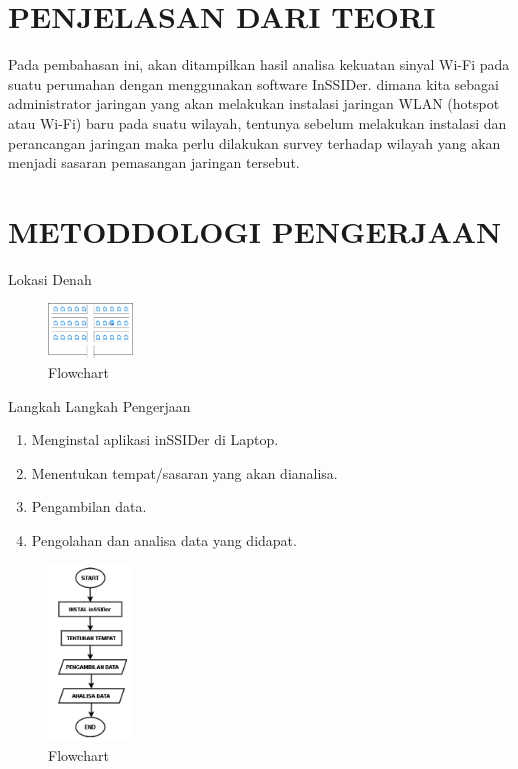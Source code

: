 \documentclass[conference]{IEEEtran}
\begin{document}
\vspace{0.3cm}

\section{PENJELASAN DARI TEORI}

\vspace{0.2cm}

Pada pembahasan ini, akan ditampilkan hasil analisa kekuatan
sinyal Wi-Fi pada suatu perumahan dengan menggunakan software InSSIDer.
dimana kita sebagai administrator jaringan yang akan melakukan instalasi jaringan WLAN (hotspot atau Wi-Fi) baru pada suatu wilayah, tentunya sebelum melakukan instalasi dan perancangan jaringan maka perlu dilakukan survey terhadap wilayah yang akan menjadi sasaran pemasangan jaringan tersebut.

\vspace{0.3cm}

\section{METODDOLOGI PENGERJAAN}

\vspace{0.2cm}
Lokasi Denah
\vspace{0.2cm}
\begin{figure}[h]
	\centering
	\includegraphics[width=0.2\textwidth]{Denah.png}
	\caption{Flowchart}
\end{figure}

\vspace{0.2cm}
Langkah Langkah Pengerjaan
\begin{enumerate}
    \item Menginstal aplikasi inSSIDer di Laptop.
    \item Menentukan tempat/sasaran yang akan dianalisa.
    \item Pengambilan data.
    \item Pengolahan dan analisa data yang didapat.
\end{enumerate}

\begin{figure}[h]
	\centering
	\includegraphics[width=0.2\textwidth]{Gambar1.png}
	\caption{Flowchart}
\end{figure}
\end{document}
